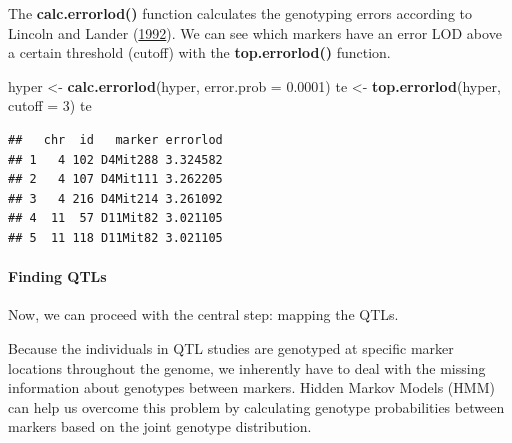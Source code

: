 \documentclass[12pt,]{book}
\newenvironment{Shaded}{\begin{snugshade}}{\end{snugshade}}
\newcommand{\KeywordTok}[1]{\textcolor[rgb]{0.13,0.29,0.53}{\textbf{{#1}}}}
\newcommand{\DataTypeTok}[1]{\textcolor[rgb]{0.13,0.29,0.53}{{#1}}}
\newcommand{\DecValTok}[1]{\textcolor[rgb]{0.00,0.00,0.81}{{#1}}}
\newcommand{\FloatTok}[1]{\textcolor[rgb]{0.00,0.00,0.81}{{#1}}}
\newcommand{\StringTok}[1]{\textcolor[rgb]{0.31,0.60,0.02}{{#1}}}
\newcommand{\OtherTok}[1]{\textcolor[rgb]{0.56,0.35,0.01}{{#1}}}
\newcommand{\NormalTok}[1]{{#1}}
\let\oldparagraph\paragraph
\renewcommand{\paragraph}[1]{\oldparagraph{#1}\mbox{}}
\theoremstyle{definition}
\theoremstyle{definition}
\theoremstyle{remark}
\begin{document}
The \textbf{calc.errorlod()} function calculates the genotyping errors
according to Lincoln and Lander
(\protect\hyperlink{ref-Lincoln1992604}{1992}). We can see which markers
have an error LOD above a certain threshold (cutoff) with the
\textbf{top.errorlod()} function.

\begin{Shaded}
\begin{Highlighting}[]
\NormalTok{hyper <-}\StringTok{ }\KeywordTok{calc.errorlod}\NormalTok{(hyper, }\DataTypeTok{error.prob =} \FloatTok{0.0001}\NormalTok{)}
\NormalTok{te <-}\StringTok{ }\KeywordTok{top.errorlod}\NormalTok{(hyper, }\DataTypeTok{cutoff =} \DecValTok{3}\NormalTok{)}
\NormalTok{te}
\end{Highlighting}
\end{Shaded}

\begin{verbatim}
##   chr  id   marker errorlod
## 1   4 102 D4Mit288 3.324582
## 2   4 107 D4Mit111 3.262205
## 3   4 216 D4Mit214 3.261092
## 4  11  57 D11Mit82 3.021105
## 5  11 118 D11Mit82 3.021105
\end{verbatim}

\begin{Shaded}
\end{Shaded}

\paragraph{Finding QTLs}\label{finding-qtls}

Now, we can proceed with the central step: mapping the QTLs.

Because the individuals in QTL studies are genotyped at specific marker
locations throughout the genome, we inherently have to deal with the
missing information about genotypes between markers. Hidden Markov
Models (HMM) can help us overcome this problem by calculating genotype
probabilities between markers based on the joint genotype distribution.
\end{document}
